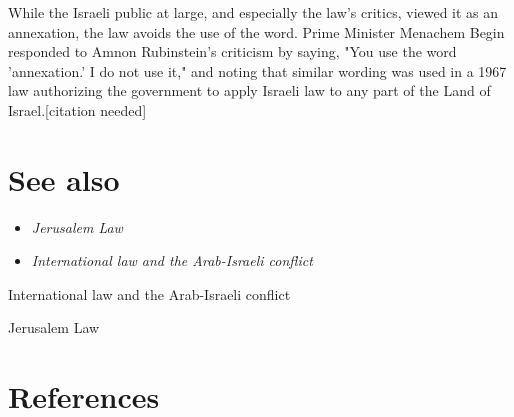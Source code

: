 While the Israeli public at large, and especially the law's critics,
viewed it as an annexation, the law avoids the use of the word. Prime
Minister Menachem Begin responded to Amnon Rubinstein's criticism by
saying, "You use the word 'annexation.' I do not use it," and noting
that similar wording was used in a 1967 law authorizing the government
to apply Israeli law to any part of the Land of Israel.{[}citation
needed{]}

\section{See also}\label{see-also}

\begin{itemize}
\item
  \emph{Jerusalem Law}
\item
  \emph{International law and the Arab-Israeli conflict}
\end{itemize}

International law and the Arab-Israeli conflict

Jerusalem Law

\section{References}\label{references}
